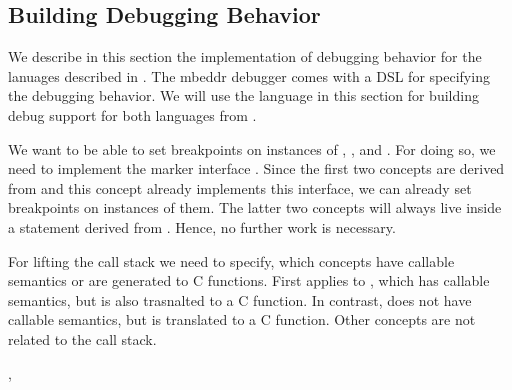 \subsection{Building Debugging Behavior}

We describe in this section the implementation of debugging behavior for the
lanuages described in . The mbeddr debugger
comes with a \ac{DSL} for specifying the debugging behavior. 
We will use the language in this section for
building debug support for both languages from .

 We want to be able to set breakpoints on instances of
, , and
.
For doing so, we need to implement the marker interface . 
Since the first two concepts
are derived from  and this concept already implements this
interface, we can already set breakpoints on instances of them. The latter two
concepts will always live inside a statement derived
from . Hence, no further work is necessary.

 For lifting the call stack we need to specify, which
concepts have callable semantics or are generated to C functions. First applies
to , which has callable semantics, but is also trasnalted to a C
function. In contrast,  does not have callable
semantics, but is translated to a C function. Other concepts are not
related to the call stack.

 ,  






\ic{}



